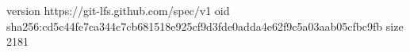 version https://git-lfs.github.com/spec/v1
oid sha256:cd5c44fe7ca344c7cb681518e925cf9d3fde0adda4e62f9c5a03aab05cfbc9fb
size 2181
